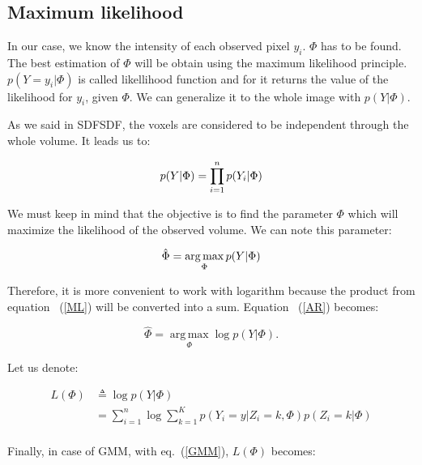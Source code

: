 \subsection{Maximum likelihood}
In our case, we know the intensity of each observed pixel $y_i$. $\Phi$ has to be found. The best estimation of $\Phi$ will be obtain using the maximum likelihood principle. $p(Y=y_i|\Phi)$ is called likellihood function and for it returns the value of the likelihood for $y_i$, given $\Phi$. We can generalize it to the whole image with $p(Y|\Phi)$.
\par
As we said in SDFSDF, the voxels are considered to be independent through the whole volume. It leads us to:
 
  \begin{equation}\label{ML}
  p(Y|\Phi)= \prod_{i=1}^n p(Y_i|\Phi)\\
  \end{equation}

\par
We must keep in mind that the objective is to find the parameter $\Phi$ which will maximize the likelihood of the observed volume. We can note this parameter:
  
  \begin{equation}\label{AR}
  \hat{\Phi}=\operatorname*{arg\,max}_\Phi p(Y|\Phi)\\
  \end{equation}

\par
Therefore, it is more convenient to work with logarithm because the product from equation ~(\ref{ML}) will be converted into a sum. Equation ~(\ref{AR}) becomes:
  
  \begin{equation*}\label{ARL}
  \hat{\Phi}=\operatorname*{arg\,max}_\Phi \operatorname*{log} p(Y|\Phi). %
  \end{equation*}

Let us denote:

  \begin{align*}
  L(\Phi) &\triangleq \operatorname*{log} p(Y|\Phi) \\
          &= \sum_{i=1}^n \operatorname*{log}\sum_{k=1}^K p(Y_i=y|Z_i=k,\Phi)p(Z_i=k|\Phi)\\
  \end{align*} 

Finally, in case of GMM, with eq.~(\ref{GMM}), $L(\Phi)$ becomes:
  
